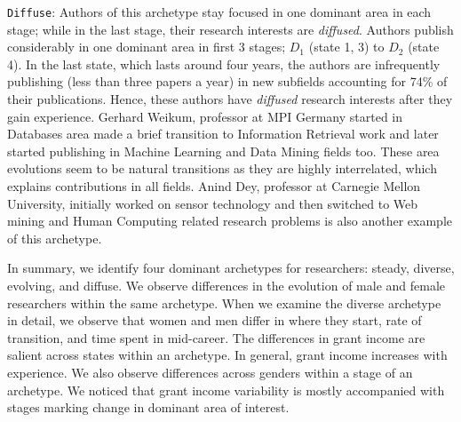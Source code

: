 \documentclass[10pt,letterpaper]{article}
\begin{document}
\texttt{Diffuse}: Authors of this archetype stay focused in one dominant area in each stage; while in the last stage, their research interests are \emph{diffused}. Authors publish considerably in one dominant area in first 3 stages; $D_1$ (state 1, 3) to $D_2$ (state 4). In the last state, which lasts around four years, the authors are infrequently publishing (less than three papers a year) in new subfields accounting for 74\% of their publications. Hence, these authors have \emph{diffused} research interests after they gain experience.
Gerhard Weikum, professor at MPI Germany started in Databases area made a brief transition to Information Retrieval work and later started publishing in Machine Learning and Data Mining fields too. These area evolutions seem to be natural transitions as they are highly interrelated, which explains contributions in all fields.
Anind Dey, professor at Carnegie Mellon University, initially worked on sensor technology and then switched to Web mining and Human Computing related research problems is also another example of this archetype.

%

\vspace{0.2in}
In summary, we identify four dominant archetypes for researchers: steady, diverse, evolving, and diffuse. We observe differences in the evolution of male and female researchers within the same archetype. When we examine the diverse archetype in detail, we observe that women and men differ in where they start, rate of transition, and time spent in mid-career. The differences in grant income are salient across states within an archetype. In general, grant income increases with experience. We also observe differences across genders within a stage of an archetype. We noticed that grant income variability is mostly accompanied with stages marking change in dominant area of interest.
\end{document}
